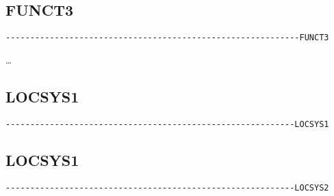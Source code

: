 \subsection{FUNCT3}
\begin{verbatim}
------------------------------------------------------------FUNCT3
\end{verbatim}
\ldots

\subsection{LOCSYS1}
\begin{verbatim}
-----------------------------------------------------------LOCSYS1
\end{verbatim}




\subsection{LOCSYS1}
\begin{verbatim}
-----------------------------------------------------------LOCSYS2
\end{verbatim}

